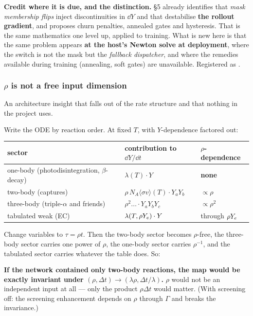 \textbf{Credit where it is due, and the distinction.}
 \S 5 already identifies
that \emph{mask membership flips} inject discontinuities in $\dd Y$ and \enuc{}
that destabilise \textbf{the rollout gradient}, and proposes churn penalties,
annealed gates and hysteresis. That is the same mathematics one level up,
applied to training. What is new here is that the same problem appears
\textbf{at the host's Newton solve at deployment}, where the switch is not the
mask but the \emph{fallback dispatcher}, and where the remedies available during
training (annealing, soft gates) are unavailable. Registered as .

\subsubsection{\texorpdfstring{$\rho$}{rho} is not a free input dimension}
\label{sec:rhoinput}

An architecture insight that falls out of the rate structure and that nothing in
the project uses.

Write the ODE by reaction order. At fixed $T$, with $Y$-dependence factored out:

\begingroup
\small
\begin{tabularx}{\textwidth}{@{}L{5.2cm} Y L{2.6cm}@{}}
\toprule
\textbf{sector} & \textbf{contribution to $\dd Y/\dd t$} & \textbf{$\rho$-dependence} \\
\midrule
one-body (photodisintegration, $\beta$-decay) & $\lambda(T)\cdot Y$ & \textbf{none} \\
two-body (captures) & $\rho\, N_A\langle\sigma v\rangle(T)\cdot Y_aY_b$ & \textbf{$\propto \rho$} \\
three-body (triple-$\alpha$ and friends) & $\rho^{2}\ldots\cdot Y_aY_bY_c$ & \textbf{$\propto \rho^{2}$} \\
tabulated weak (EC) & $\lambda(T, \rho Y_{e})\cdot Y$ & through \textbf{$\rho Y_{e}$} \\
\bottomrule
\end{tabularx}
\endgroup

Change variables to $\tau = \rho t$. Then the two-body sector becomes
$\rho$-free, the three-body sector carries one power of $\rho$, the one-body
sector carries $\rho^{-1}$, and the tabulated sector carries whatever the table
does. So:

\begin{result}
\textbf{If the network contained only two-body reactions, the map would be
exactly invariant under $(\rho, \Delta t) \to (\lambda\rho, \Delta t/\lambda)$.}
$\rho$ would not be an independent input at all --- only the product
$\rho\Delta t$ would matter. (With screening off: the screening enhancement
depends on $\rho$ through $\Gamma$ and breaks the invariance.)
\end{result}

